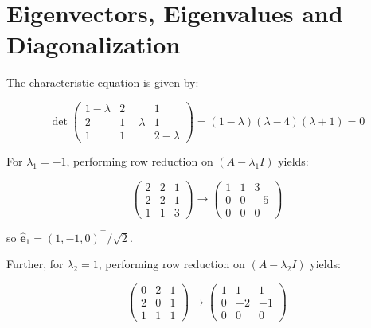 \documentclass[12pt]{article}
\begin{document}



\pagebreak
\section*{Eigenvectors, Eigenvalues and Diagonalization}


The characteristic equation is given by:

\begin{equation}
    \det\begin{pmatrix}
        1 - \lambda & 2           & 1           \\
        2           & 1 - \lambda & 1           \\
        1           & 1           & 2 - \lambda
    \end{pmatrix} = (1 - \lambda)(\lambda - 4)(\lambda + 1) = 0
\end{equation}

For $\lambda_{1} = -1$, performing row reduction on $(A - \lambda_{1}I)$ yields:

\begin{equation}
    \begin{pmatrix}
        2 & 2 & 1 \\
        2 & 2 & 1 \\
        1 & 1 & 3
    \end{pmatrix}
    \to
    \begin{pmatrix}
        1 & 1 & 3  \\
        0 & 0 & -5 \\
        0 & 0 & 0
    \end{pmatrix}
\end{equation}

so $\hat{\mathbf{e}}_{1} = (1, -1, 0)^{\intercal}/\sqrt{2}$.

Further, for $\lambda_{2} = 1$, performing row reduction on $(A - \lambda_{2}I)$ yields:

\begin{equation}
    \begin{pmatrix}
        0 & 2 & 1 \\
        2 & 0 & 1 \\
        1 & 1 & 1
    \end{pmatrix}
    \to
    \begin{pmatrix}
        1 & 1  & 1  \\
        0 & -2 & -1 \\
        0 & 0  & 0
    \end{pmatrix}
\end{equation}
\end{document}
